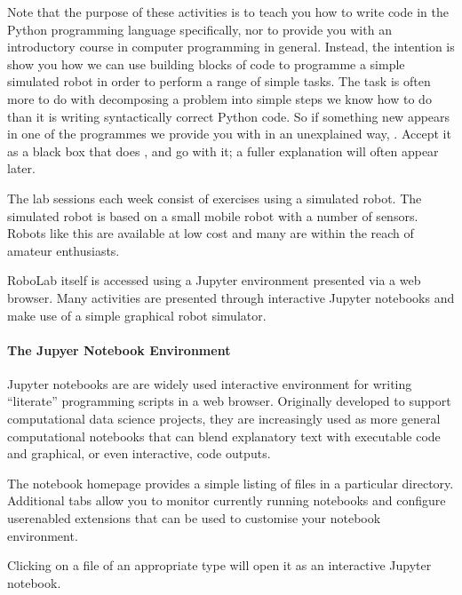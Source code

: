 \documentclass[letterpaper,10pt,english]{sphinxmanual}
\let\sphinxpxdimen\pdfpxdimen\else\newdimen\sphinxpxdimen
\begin{document}
Note that the purpose of these activities is  to teach you how to write code in the Python programming language specifically, nor to provide you with an introductory course in computer programming in general. Instead, the intention is show you how we can use building blocks of code to programme a simple simulated robot in order to perform a range of simple tasks. The  task is often more to do with decomposing a problem into simple steps we know how to do than it is writing
syntactically correct Python code. So if something new appears in one of the programmes we provide you with in an unexplained way, . Accept it as a black box that does , and go with it; a fuller explanation will often appear later.

The lab sessions each week consist of exercises using a simulated robot. The simulated robot is based on a small mobile robot with a number of sensors. Robots like this are available at low cost and many are within the reach of amateur enthusiasts.

RoboLab itself is accessed using a Jupyter environment presented via a web browser. Many activities are presented through interactive Jupyter notebooks and make use of a simple graphical robot simulator.


\paragraph{The Jupyer Notebook Environment}
\label{\detokenize{content/00_SOFTWARE_GUIDE/Section_00_01_Jupyter_environment:The-Jupyer-Notebook-Environment}}
Jupyter notebooks are are widely used interactive environment for writing “literate” programming scripts in a web browser. Originally developed to support computational data science projects, they are increasingly used as more general computational notebooks that can blend explanatory text with executable code and graphical, or even interactive, code outputs.

The notebook homepage provides a simple listing of files in a particular directory. Additional tabs allow you to monitor currently running notebooks and configure user\sphinxhyphen{}enabled extensions that can be used to customise your notebook environment.

\noindent\sphinxincludegraphics[width=2160\sphinxpxdimen,height=564\sphinxpxdimen]{{00_01_jupyter_nb_homepage}.png}

Clicking on a file of an appropriate type will open it as an interactive Jupyter notebook.
\end{document}
